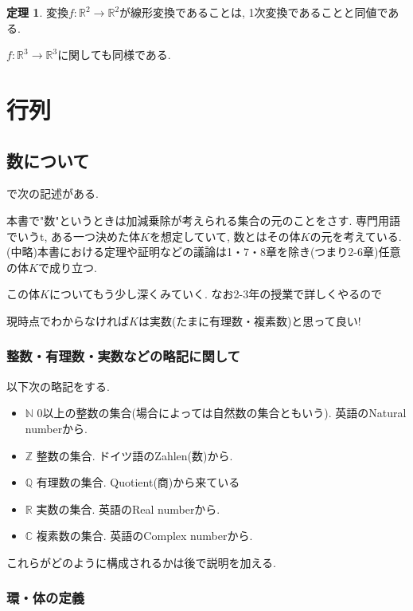 \documentclass[dvipdfmx,a4paper,11pt]{article} %
\newcommand{\R}{\mathbb{R}}
\newcommand{\Z}{\mathbb{Z}}
\newcommand{\Q}{\mathbb{Q}}
\newcommand{\N}{\mathbb{N}}
\newcommand{\C}{\mathbb{C}}
\theoremstyle{definition}
\newtheorem{thm}{定理}
\begin{document}
\begin{thm}\cite[定理 1.2.6]{O}
変換$f : \R^2 \to \R^2$が線形変換であることは, 1次変換であることと同値である. 
\end{thm}
$f : \R^3 \to \R^3$に関しても同様である. 

\newpage


\section{行列 \cite[2章]{O}}
\setcounter{subsection}{-1}
\subsection{数について}
\cite[2.1節]{O}で次の記述がある. 
\begin{tcolorbox}[mybox]
本書で"数"というときは加減乗除が考えられる集合の元のことをさす. 
専門用語でいうt, ある一つ決めた体$K$を想定していて, 数とはその体$K$の元を考えている. 
(中略)本書における定理や証明などの議論は1・7・8章を除き(つまり2-6章)任意の体$K$で成り立つ.
\end{tcolorbox}

この体$K$についてもう少し深くみていく. 
なお2-3年の授業で詳しくやるので
\begin{tcolorbox}[mybox]
\begin{center}
現時点でわからなければ$K$は実数(たまに有理数・複素数)と思って良い!
\end{center}
\end{tcolorbox}


\subsubsection{整数・有理数・実数などの略記に関して}

以下次の略記をする.
\begin{itemize}
\item $\N$ 0以上の整数の集合(場合によっては自然数の集合ともいう). 英語のNatural numberから. 
\item $\Z$  整数の集合. ドイツ語のZahlen(数)から. 
\item $\Q$ 有理数の集合. Quotient(商)から来ている
\item $\R$ 実数の集合. 英語のReal numberから. 
\item $\C$ 複素数の集合. 英語のComplex numberから. 
\end{itemize}

これらがどのように構成されるかは後で説明を加える. 

\subsubsection{環・体の定義}
\end{document}
